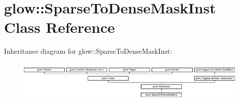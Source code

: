 \hypertarget{classglow_1_1_sparse_to_dense_mask_inst}{}\section{glow\+:\+:Sparse\+To\+Dense\+Mask\+Inst Class Reference}
\label{classglow_1_1_sparse_to_dense_mask_inst}
Inheritance diagram for glow\+:\+:Sparse\+To\+Dense\+Mask\+Inst\+:\begin{figure}[H]
\begin{center}
\leavevmode
\includegraphics[height=1.991111cm]{classglow_1_1_sparse_to_dense_mask_inst}
\end{center}
\end{figure}
